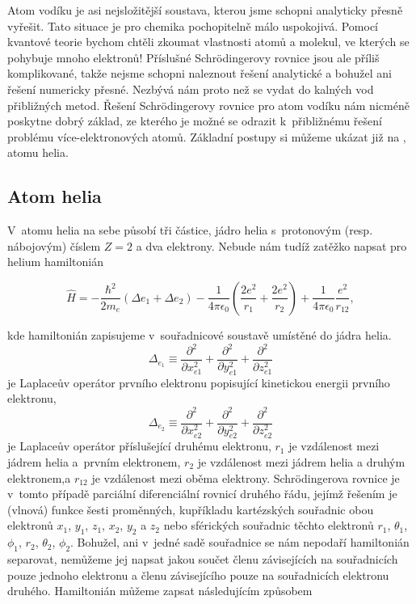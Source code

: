Atom vodíku je asi nejsložitější soustava, kterou jsme schopni analyticky přesně vyřešit. Tato situace je pro chemika pochopitelně málo uspokojivá. Pomocí kvantové teorie bychom chtěli zkoumat vlastnosti atomů a molekul, ve kterých se pohybuje mnoho elektronů! Příslušné Schr\"odingerovy rovnice jsou ale příliš komplikované, takže nejsme schopni naleznout řešení analytické a bohužel ani řešení numericky přesné. Nezbývá nám proto než se vydat do kalných vod přibližných metod. Řešení Schr\"odingerovy rovnice pro atom vodíku nám nicméně poskytne dobrý základ, ze kterého je možné se odrazit k~přibližnému řešení problému více-elektronových atomů. Základní postupy si můžeme ukázat již na , atomu helia.  

\subsection{Atom helia}
V~atomu helia na sebe působí tři částice, jádro helia s~protonovým (resp. nábojovým) číslem $Z = 2$ a dva elektrony. Nebude nám tudíž zatěžko napsat pro helium hamiltonián 

\begin{equation}
\hat{H} = - \frac{\hbar^2}{2 m_e} \left( \Delta e_1 + \Delta e_2 \right) - \frac{1}{4 \pi \epsilon_0} \left(\frac{2e^2}{r_1} + \frac{2e^2}{r_2} \right) + \frac{1}{4 \pi \epsilon_0} \frac{e^2}{r_{12}},
\label{rov:VE-1}
\end{equation}


\noindent kde hamiltonián zapisujeme v~souřadnicové soustavě umístěné do jádra helia.
\begin{equation}
\Delta_{e_1} \equiv \frac{\partial^2}{\partial x_{e1}^2} + \frac{\partial^2}{\partial y_{e1}^2}+\frac{\partial^2}{\partial z_{e1}^2} \nonumber
\end{equation}
je Laplaceův operátor prvního elektronu popisující kinetickou energii prvního elektronu,
\begin{equation}
\Delta_{e_2} \equiv \frac{\partial^2}{\partial x_{e2}^2} + \frac{\partial^2}{\partial y_{e2}^2}+\frac{\partial^2}{\partial z_{e2}^2} \nonumber
\end{equation}
je Laplaceův operátor příslušející druhému elektronu, $r_1$ je vzdálenost mezi jádrem helia a~prvním elektronem, $r_2$ je vzdálenost mezi jádrem helia a druhým elektronem,a $r_{12}$ je vzdálenost mezi oběma elektrony. Schr\"odingerova rovnice je v~tomto případě parciální diferenciální rovnicí druhého řádu, jejímž řešením je (vlnová) funkce šesti proměnných, kupříkladu kartézských souřadnic obou elektronů $x_1$, $y_1$, $z_1$, $x_2$, $y_2$ a $z_2$ nebo sférických souřadnic těchto elektronů $r_1$, $\theta_1$, $\phi_1$, $r_2$, $\theta_2$, $\phi_2$. Bohužel, ani v~jedné sadě souřadnice se nám nepodaří hamiltonián separovat, nemůžeme jej napsat jakou součet členu závisejících na souřadnicích pouze jednoho elektronu a členu závisejícího pouze na souřadnicích elektronu druhého. Hamiltonián můžeme zapsat následujícím způsobem

